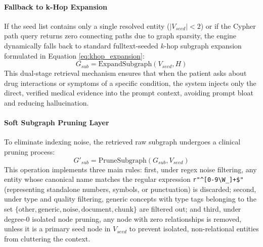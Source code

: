 \documentclass[../main.tex]{subfiles}
\begin{document}
\paragraph{Fallback to k-Hop Expansion}
If the seed list contains only a single resolved entity ($|V_{seed}| < 2$) or if the Cypher path query returns zero connecting paths due to graph sparsity, the engine dynamically falls back to standard fulltext-seeded $k$-hop subgraph expansion formulated in Equation \eqref{eq:khop_expansion}:
\begin{equation}\label{eq:khop_expansion}
G_{sub} = \text{ExpandSubgraph}(V_{seed}, H)
\end{equation}
This dual-stage retrieval mechanism ensures that when the patient asks about drug interactions or symptoms of a specific condition, the system injects only the direct, verified medical evidence into the prompt context, avoiding prompt bloat and reducing hallucination.

\paragraph{Soft Subgraph Pruning Layer}
To eliminate indexing noise, the retrieved raw subgraph undergoes a clinical pruning process:
\begin{equation}\label{eq:prune_subgraph}
G'_{sub} = \text{PruneSubgraph}(G_{sub}, V_{seed})
\end{equation}
This operation implements three main rules: first, under regex noise filtering, any entity whose canonical name matches the regular expression \texttt{r"\textasciicircum{}[0-9\textbackslash W\_]+\$"} (representing standalone numbers, symbols, or punctuation) is discarded; second, under type and quality filtering, generic concepts with type tags belonging to the set $\{\text{other}, \text{generic}, \text{noise}, \text{document}, \text{chunk}\}$ are filtered out; and third, under degree-0 isolated node pruning, any node with zero relationships is removed, unless it is a primary seed node in $V_{seed}$ to prevent isolated, non-relational entities from cluttering the context.
\end{document}
